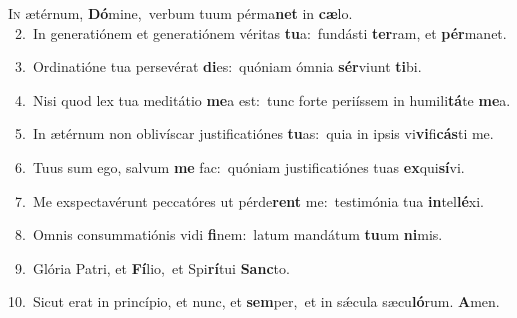 \lettrine{\initial\textcolor{\initialcolor}{I}}{n} ætérnum, \textbf{Dó}\-mine,~\star verbum tuum pérma\textbf{net} in \textbf{cæ}\-lo.\\
{\numbfont\textcolor{\numbcolor}{~2.}}~In generatiónem et generatiónem véritas \textbf{tu}\-a:~\star fundásti \textbf{ter}\-ram, et \textbf{pér}\-manet.\par
{\numbfont\textcolor{\numbcolor}{~3.}}~Ordinatióne tua persevérat \textbf{di}\-es:~\star quóniam ómnia \textbf{sér}\-viunt \textbf{ti}\-bi.\par
{\numbfont\textcolor{\numbcolor}{~4.}}~Nisi quod lex tua meditátio \textbf{me}\-a est:~\star tunc forte periíssem in humili\-\textbf{tá}\-te \textbf{me}\-a.\par
{\numbfont\textcolor{\numbcolor}{~5.}}~In ætérnum non oblivíscar justificatiónes \textbf{tu}\-as:~\star quia in ipsis vi\-\textbf{vi}\-fi\-\textbf{cás}\-ti me.\par
{\numbfont\textcolor{\numbcolor}{~6.}}~Tuus sum ego, salvum \textbf{me} fac:~\star quóniam justificatiónes tuas \textbf{ex}\-qui\-\textbf{sí}\-vi.\par
{\numbfont\textcolor{\numbcolor}{~7.}}~Me exspectavérunt peccatóres ut pérde\textbf{rent} me:~\star testimónia tua \textbf{in}\-tel\-\textbf{lé}\-xi.\par
{\numbfont\textcolor{\numbcolor}{~8.}}~Omnis consummatiónis vidi \textbf{fi}\-nem:~\star latum mandátum \textbf{tu}\-um \textbf{ni}\-mis.\par
{\numbfont\textcolor{\numbcolor}{~9.}}~Glória Patri, et \textbf{Fí}\-lio,~\star et Spi\-\textbf{rí}\-tui \textbf{Sanc}\-to.\par
{\numbfont\textcolor{\numbcolor}{10.}}~Sicut erat in princípio, et nunc, et \textbf{sem}\-per,~\star et in sǽcula sæcu\-\textbf{ló}\-rum. \textbf{A}\-men.\par
